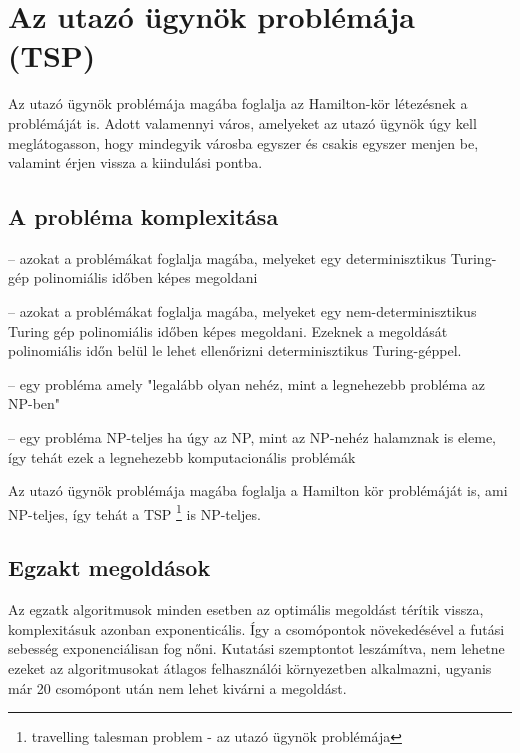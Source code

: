 \chapter{Az utazó ügynök problémája (TSP)}\label{ch:ALAP}


Az utazó ügynök problémája magába foglalja az Hamilton-kör létezésnek a problémáját is. Adott valamennyi város, amelyeket az utazó ügynök úgy kell meglátogasson, hogy mindegyik városba egyszer és csakis egyszer menjen be, valamint érjen vissza a kiindulási pontba.

\section{A probléma komplexitása}\label{sec:ALAP:adatelem}

\begin{description}
	\setlength{\itemsep}{0.04mm}
	\item[P] -- azokat a problémákat foglalja magába, melyeket egy determinisztikus Turing-gép polinomiális időben képes megoldani
	\item[NP] -- azokat a problémákat foglalja magába, melyeket egy nem-determinisztikus Turing gép polinomiális időben képes megoldani. Ezeknek a megoldását polinomiális időn belül le lehet ellenőrizni determinisztikus Turing-géppel.
	\item[NP-nehéz] -- egy probléma amely "legalább olyan nehéz, mint a legnehezebb probléma az NP-ben"
	\item[NP-teljes] -- egy probléma NP-teljes ha úgy az NP, mint az NP-nehéz halamznak is eleme, így tehát ezek a legnehezebb komputacionális problémák
\end{description}


Az utazó ügynök problémája magába foglalja a Hamilton kör problémáját is, ami NP-teljes, így tehát a TSP%
\footnote{ %
	travelling talesman problem - az utazó ügynök problémája
}  %
 is NP-teljes.
\section{Egzakt megoldások}\label{sec:ALAP:adatelem}

Az egzatk algoritmusok minden esetben az optimális megoldást térítik vissza, komplexitásuk azonban exponenticális. Így a csomópontok növekedésével a futási sebesség exponenciálisan fog nőni. Kutatási szemptontot leszámítva, nem lehetne ezeket az algoritmusokat átlagos felhasználói környezetben alkalmazni, ugyanis már 20 csomópont után nem lehet kivárni a megoldást. 

